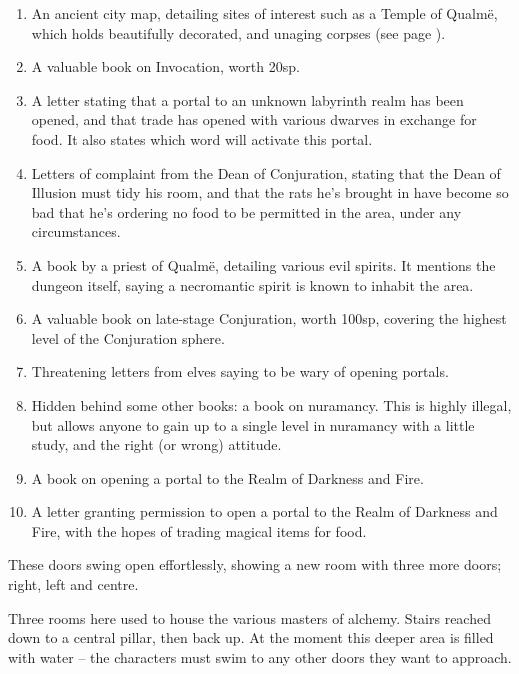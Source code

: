 \begin{multicols}{2}
\begin{enumerate}
	\item{An ancient city map, detailing sites of interest such as a Temple of Qualm\"{e}, which holds beautifully decorated, and unaging corpses (see page \pageref{green_tower})}.
	\item{A valuable book on Invocation, worth 20sp.}
	\item{A letter stating that a portal to an unknown labyrinth realm has been opened, and that trade has opened with various dwarves in exchange for food.  It also states which word will activate this portal.}
	\item{Letters of complaint from the Dean of Conjuration, stating that the Dean of Illusion must tidy his room, and that the rats he's brought in have become so bad that he's ordering no food to be permitted in the area, under any circumstances.}
	\item{A book by a priest of Qualm\"{e}, detailing various evil spirits.  It mentions the dungeon itself, saying a necromantic spirit is known to inhabit the area.}
	\item{A valuable book on late-stage Conjuration, worth 100sp, covering the highest level of the Conjuration sphere.}
	\item{Threatening letters from elves saying to be wary of opening portals.}
	\item{Hidden behind some other books: a book on nuramancy.  This is highly illegal, but allows anyone to gain up to a single level in nuramancy with a little study, and the right (or wrong) attitude.}
	\item{A book on opening a portal to the Realm of Darkness and Fire.}
	\item{A letter granting permission to open a portal to the Realm of Darkness and Fire, with the hopes of trading magical items for food.}

\end{enumerate}


\begin{boxtext}
	These doors swing open effortlessly, showing a new room with three more doors; right, left and centre.

\end{boxtext}

Three rooms here used to house the various masters of alchemy.  Stairs reached down to a central pillar, then back up.  At the moment this deeper area is filled with water -- the characters must swim to any other doors they want to approach.


\end{multicols}
